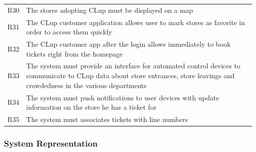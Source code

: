 \begin{tabular}{C{1cm}L{14.1cm}}
    R30   & The stores adopting CLup must be displayed on a map                                                                                                                             \\
    R31   & The CLup customer application allows user to mark stores as favorite in order to access them quickly                                                                            \\
    R32   & The CLup customer app after the login allows immediately to book tickets right from the homepage                                                                                \\
    R33   & The system must provide an interface for automated control devices to communicate to CLup data about store entrances, store leavings and crowdedness in the various departments \\
    R34   & The system must push notifications to user devices with update information on the store he has a ticket for                                                                     \\
    R35  & The system must associates tickets with line numbers                                                                                                                            \\
\end{tabular}
\vfill

\subsubsection{System Representation}



